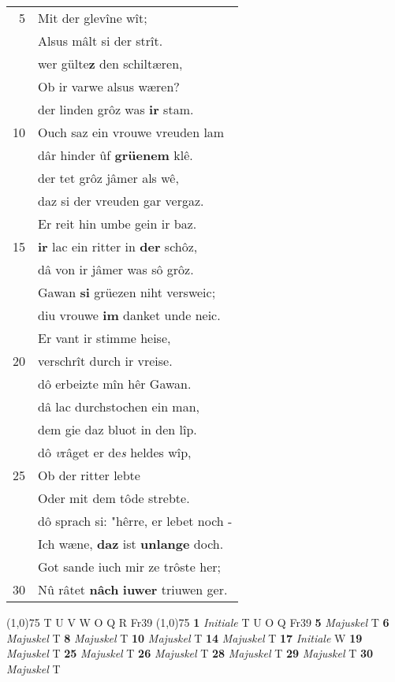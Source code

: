 \documentclass[8pt,a4paper,notitlepage]{article}
\begin{document}
\begin{table}[ht]
\begin{minipage}[t]{0.5\linewidth}
\begin{tabular}{rl}
5 & Mit der glevîne wît;\\ 
 & Alsus mâlt si der strît.\\ 
 & wer gülte\textbf{z} den schiltæren,\\ 
 & Ob ir varwe alsus wæren?\\ 
 & der linden grôz was \textbf{ir} stam.\\ 
10 & Ouch saz ein vrouwe vreuden lam\\ 
 & dâr hinder ûf \textbf{grüenem} klê.\\ 
 & der tet grôz jâmer als wê,\\ 
 & daz si der vreuden gar vergaz.\\ 
 & Er reit hin umbe gein ir baz.\\ 
15 & \textbf{ir} lac ein ritter in \textbf{der} schôz,\\ 
 & dâ von ir jâmer was sô grôz.\\ 
 & Gawan \textbf{si} grüezen niht versweic;\\ 
 & diu vrouwe \textbf{im} danket unde neic.\\ 
 & Er vant ir stimme heise,\\ 
20 & verschrît durch ir vreise.\\ 
 & dô erbeizte mîn hêr Gawan.\\ 
 & dâ lac durchstochen ein man,\\ 
 & dem gie daz bluot in den lîp.\\ 
 & dô \textit{v}râget er de\textit{s} heldes wîp,\\ 
25 & Ob der ritter lebte\\ 
 & Oder mit dem tôde strebte.\\ 
 & dô sprach si: "hêrre, er lebet noch -\\ 
 & Ich wæne, \textbf{daz} ist \textbf{unlange} doch.\\ 
 & Got sande iuch mir ze trôste her;\\ 
30 & Nû râtet \textbf{nâch} \textbf{iuwer} triuwen ger.\\ 
\end{tabular}
\scriptsize
\line(1,0){75} \newline
T U V W O Q R Fr39 \newline
\line(1,0){75} \newline
\textbf{1} \textit{Initiale} T U O Q Fr39  \textbf{5} \textit{Majuskel} T  \textbf{6} \textit{Majuskel} T  \textbf{8} \textit{Majuskel} T  \textbf{10} \textit{Majuskel} T  \textbf{14} \textit{Majuskel} T  \textbf{17} \textit{Initiale} W  \textbf{19} \textit{Majuskel} T  \textbf{25} \textit{Majuskel} T  \textbf{26} \textit{Majuskel} T  \textbf{28} \textit{Majuskel} T  \textbf{29} \textit{Majuskel} T  \textbf{30} \textit{Majuskel} T  \newline

\end{minipage}
\end{table}
\end{document}
